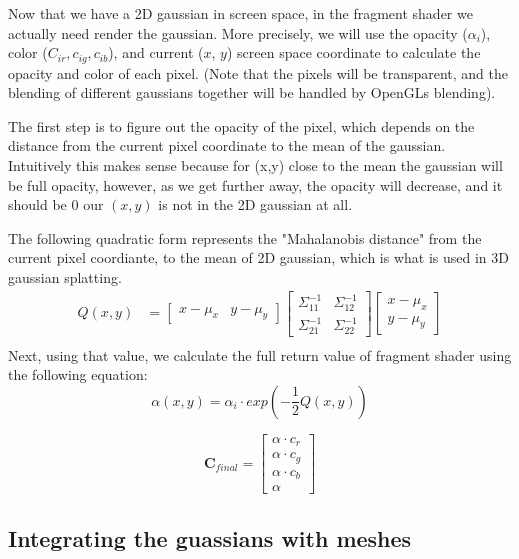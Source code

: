 \documentclass {article}
\begin{document}
     Now that we have a 2D gaussian in screen space, in the fragment shader we actually need render the gaussian. More precisely, we will use the opacity ($\alpha_i$), color ($C_{ir}, c_{ig}, c_{ib}$), and current ($x$, $y$) screen space coordinate to calculate the opacity and color of each pixel. (Note that the pixels will be transparent, and the blending of different gaussians together will be handled by OpenGLs blending).

     The first step is to figure out the opacity of the pixel, which depends on the distance from the current pixel coordinate to the mean of the gaussian. Intuitively this makes sense because for (x,y) close to the mean the gaussian will be full opacity, however, as we get further away, the opacity will decrease, and it should be 0 our $(x, y)$ is not in the 2D gaussian at all. 

      The following quadratic form represents the "Mahalanobis distance" from the current pixel coordiante, to the mean of 2D gaussian, which is what is used in 3D gaussian splatting.
          \begin{align*}
               Q(x, y) &= \begin{bmatrix}x - \mu_x & y - \mu_y\end{bmatrix}
               \begin{bmatrix}
               \Sigma^{-1}_{11} & \Sigma^{-1}_{12} \\
               \Sigma^{-1}_{21} & \Sigma^{-1}_{22}
               \end{bmatrix}
               \begin{bmatrix}x - \mu_x \\ y - \mu_y\end{bmatrix} \\
          \end{align*}
          Next, using that value, we calculate the full return value of fragment shader using the following equation:
               $$\alpha(x, y) = \alpha_i \cdot exp(-\frac{1}{2}Q(x, y))$$ 

               $$\mathbf{C}_{final} = \begin{bmatrix}
                    \alpha \cdot c_r \\
                    \alpha \cdot c_g \\
                    \alpha \cdot c_b \\
                    \alpha
                    \end{bmatrix}$$


\subsection{Integrating the guassians with meshes}
\end{document}
